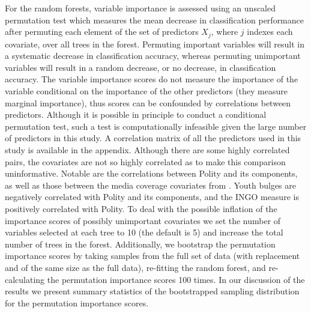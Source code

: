 \documentclass[11pt]{article}
\begin{document}
For the random forests, variable importance is assessed using an unscaled permutation test which measures the mean decrease in classification performance after permuting each element of the set of predictors $X_j$, where $j$ indexes each covariate, over all trees in the forest. Permuting important variables will result in a systematic decrease in classification accuracy, whereas permuting unimportant variables will result in a random decrease, or no decrease, in classification accuracy. The variable importance scores do not measure the importance of the variable conditional on the importance of the other predictors (they measure marginal importance), thus scores can be confounded by correlations between predictors. Although it is possible in principle to conduct a conditional permutation test, such a test is computationally infeasible given the large number of predictors in this study. A correlation matrix of all the predictors used in this study is available in the appendix. Although there are some highly correlated pairs, the covariates are not so highly correlated as to make this comparison uninformative. Notable are the correlations between Polity and its components, as well as those between the media coverage covariates from \citet{RonRamosRodgers2005}. Youth bulges are negatively correlated with Polity and its components, and the INGO measure is positively correlated with Polity. To deal with the possible inflation of the importance scores of possibly unimportant covariates we set the number of variables selected at each tree to 10 (the default is 5) and increase the total number of trees in the forest. Additionally, we bootstrap the permutation importance scores by taking samples from the full set of data (with replacement and of the same size as the full data), re-fitting the random forest, and re-calculating the permutation importance scores 100 times. In our discussion of the results we present summary statistics of the bootstrapped sampling distribution for the permutation importance scores.
\end{document}
